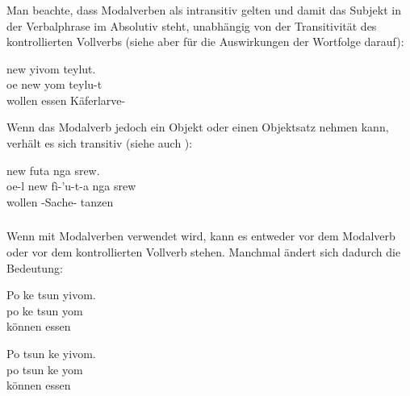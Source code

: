 \subsubsection{} Man beachte, dass Modalverben als intransitiv gelten und damit das Subjekt in der Verbalphrase im Absolutiv steht, unabhängig von der Transitivität des kontrollierten Vollverbs (siehe aber  für die Auswirkungen der Wortfolge darauf): 

\begin{interlin}
	\glll {} new yivom teylut. \\
	oe new yom teylu-t \\
	 wollen essen Käferlarve- \\
\end{interlin}

\noindent Wenn das Modalverb jedoch ein Objekt oder einen Objektsatz nehmen kann, verhält es sich transitiv (siehe auch ): 

\begin{interlin}
	\glll \Npawl{} new futa nga srew. \\
	oe-l new fì-'u-t-a nga srew \\
	 wollen -Sache-  tanzen \\
\end{interlin}

\subsubsection{}\label{syn:modal:neg}
Wenn  mit Modalverben verwendet wird, kann es entweder vor dem Modalverb oder vor dem kontrollierten Vollverb stehen. Manchmal ändert sich dadurch die Bedeutung: 

\begin{interlin}\label{syn:modal:neg:ex01}
	\glll \Npawl{}Po ke tsun yivom. \\
	po ke tsun yom \\
	  können essen \\
\end{interlin}

\begin{interlin}\label{syn:modal:neg:ex02}
	\glll \Npawl{}Po tsun ke yivom. \\
	po tsun ke yom \\
	 können  essen \\
\end{interlin}

